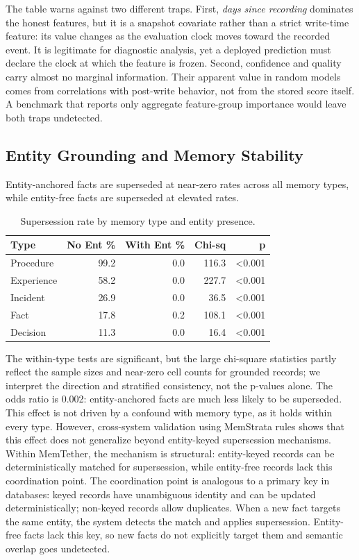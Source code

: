 \documentclass[sigconf,nonacm]{acmart}
\begin{document}
The table warns against two different traps. First, \emph{days since recording} dominates the honest features, but it is a snapshot covariate rather than a strict write-time feature: its value changes as the evaluation clock moves toward the recorded event. It is legitimate for diagnostic analysis, yet a deployed prediction must declare the clock at which the feature is frozen. Second, confidence and quality carry almost no marginal information. Their apparent value in random models comes from correlations with post-write behavior, not from the stored score itself. A benchmark that reports only aggregate feature-group importance would leave both traps undetected.

\subsection{Entity Grounding and Memory Stability}
\label{sec:entity}

Entity-anchored facts are superseded at near-zero rates across all memory types, while entity-free facts are superseded at elevated rates.

\begin{table}[h]
\centering
\caption{Supersession rate by memory type and entity presence.}
\begin{tabular}{lrrrr}
\toprule
Type & No Ent \% & With Ent \% & Chi-sq & p \\
\midrule
Procedure & 99.2 & 0.0 & 116.3 & <0.001 \\
Experience & 58.2 & 0.0 & 227.7 & <0.001 \\
Incident & 26.9 & 0.0 & 36.5 & <0.001 \\
Fact & 17.8 & 0.2 & 108.1 & <0.001 \\
Decision & 11.3 & 0.0 & 16.4 & <0.001 \\
\bottomrule
\end{tabular}
\end{table}

The within-type tests are significant, but the large chi-square statistics partly reflect the sample sizes and near-zero cell counts for grounded records; we interpret the direction and stratified consistency, not the p-values alone. The odds ratio is 0.002: entity-anchored facts are much less likely to be superseded. This effect is not driven by a confound with memory type, as it holds within every type. However, cross-system validation using MemStrata rules shows that this effect does not generalize beyond entity-keyed supersession mechanisms. Within MemTether, the mechanism is structural: entity-keyed records can be deterministically matched for supersession, while entity-free records lack this coordination point. The coordination point is analogous to a primary key in databases: keyed records have unambiguous identity and can be updated deterministically; non-keyed records allow duplicates. When a new fact targets the same entity, the system detects the match and applies supersession. Entity-free facts lack this key, so new facts do not explicitly target them and semantic overlap goes undetected.
\end{document}
